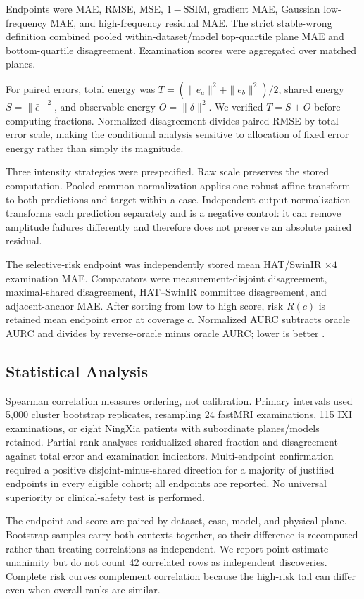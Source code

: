 \documentclass[journal,10pt]{IEEEtran}
\begin{document}
Endpoints were MAE, RMSE, MSE, $1-\mathrm{SSIM}$, gradient MAE, Gaussian low-frequency MAE, and high-frequency residual MAE. The strict stable-wrong definition combined pooled within-dataset/model top-quartile plane MAE and bottom-quartile disagreement. Examination scores were aggregated over matched planes.

For paired errors, total energy was $T=(\|e_a\|^2+\|e_b\|^2)/2$, shared energy $S=\|\bar e\|^2$, and observable energy $O=\|\delta\|^2$. We verified $T=S+O$ before computing fractions. Normalized disagreement divides paired RMSE by total-error scale, making the conditional analysis sensitive to allocation of fixed error energy rather than simply its magnitude.

Three intensity strategies were prespecified. Raw scale preserves the stored computation. Pooled-common normalization applies one robust affine transform to both predictions and target within a case. Independent-output normalization transforms each prediction separately and is a negative control: it can remove amplitude failures differently and therefore does not preserve an absolute paired residual.

The selective-risk endpoint was independently stored mean HAT/SwinIR $\times4$ examination MAE. Comparators were measurement-disjoint disagreement, maximal-shared disagreement, HAT--SwinIR committee disagreement, and adjacent-anchor MAE. After sorting from low to high score, risk $R(c)$ is retained mean endpoint error at coverage $c$. Normalized AURC subtracts oracle AURC and divides by reverse-oracle minus oracle AURC; lower is better \cite{ding2020selective}.

\subsection{Statistical Analysis}
Spearman correlation measures ordering, not calibration. Primary intervals used 5,000 cluster bootstrap replicates, resampling 24 fastMRI examinations, 115 IXI examinations, or eight NingXia patients with subordinate planes/models retained. Partial rank analyses residualized shared fraction and disagreement against total error and examination indicators. Multi-endpoint confirmation required a positive disjoint-minus-shared direction for a majority of justified endpoints in every eligible cohort; all endpoints are reported. No universal superiority or clinical-safety test is performed.

The endpoint and score are paired by dataset, case, model, and physical plane. Bootstrap samples carry both contexts together, so their difference is recomputed rather than treating correlations as independent. We report point-estimate unanimity but do not count 42 correlated rows as independent discoveries. Complete risk curves complement correlation because the high-risk tail can differ even when overall ranks are similar.
\end{document}
